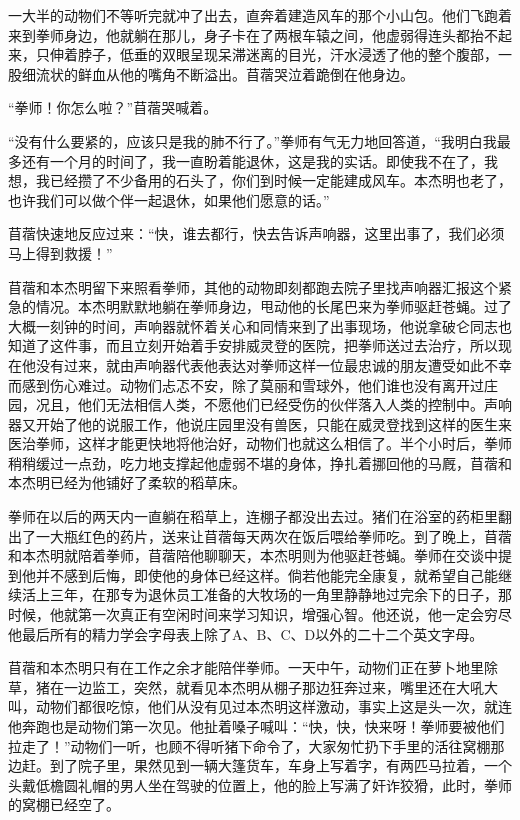 一大半的动物们不等听完就冲了出去，直奔着建造风车的那个小山包。他们飞跑着来到拳师身边，他就躺在那儿，身子卡在了两根车辕之间，他虚弱得连头都抬不起来，只伸着脖子，低垂的双眼呈现呆滞迷离的目光，汗水浸透了他的整个腹部，一股细流状的鲜血从他的嘴角不断溢出。苜蓿哭泣着跪倒在他身边。

“拳师！你怎么啦？”苜蓿哭喊着。

“没有什么要紧的，应该只是我的肺不行了。”拳师有气无力地回答道，“我明白我最多还有一个月的时间了，我一直盼着能退休，这是我的实话。即使我不在了，我想，我已经攒了不少备用的石头了，你们到时候一定能建成风车。本杰明也老了，也许我们可以做个伴一起退休，如果他们愿意的话。”

苜蓿快速地反应过来：“快，谁去都行，快去告诉声响器，这里出事了，我们必须马上得到救援！”

苜蓿和本杰明留下来照看拳师，其他的动物即刻都跑去院子里找声响器汇报这个紧急的情况。本杰明默默地躺在拳师身边，甩动他的长尾巴来为拳师驱赶苍蝇。过了大概一刻钟的时间，声响器就怀着关心和同情来到了出事现场，他说拿破仑同志也知道了这件事，而且立刻开始着手安排威灵登的医院，把拳师送过去治疗，所以现在他没有过来，就由声响器代表他表达对拳师这样一位最忠诚的朋友遭受如此不幸而感到伤心难过。动物们忐忑不安，除了莫丽和雪球外，他们谁也没有离开过庄园，况且，他们无法相信人类，不愿他们已经受伤的伙伴落入人类的控制中。声响器又开始了他的说服工作，他说庄园里没有兽医，只能在威灵登找到这样的医生来医治拳师，这样才能更快地将他治好，动物们也就这么相信了。半个小时后，拳师稍稍缓过一点劲，吃力地支撑起他虚弱不堪的身体，挣扎着挪回他的马厩，苜蓿和本杰明已经为他铺好了柔软的稻草床。

拳师在以后的两天内一直躺在稻草上，连棚子都没出去过。猪们在浴室的药柜里翻出了一大瓶红色的药片，送来让苜蓿每天两次在饭后喂给拳师吃。到了晚上，苜蓿和本杰明就陪着拳师，苜蓿陪他聊聊天，本杰明则为他驱赶苍蝇。拳师在交谈中提到他并不感到后悔，即使他的身体已经这样。倘若他能完全康复，就希望自己能继续活上三年，在那专为退休员工准备的大牧场的一角里静静地过完余下的日子，那时候，他就第一次真正有空闲时间来学习知识，增强心智。他还说，他一定会穷尽他最后所有的精力学会字母表上除了A、B、C、D以外的二十二个英文字母。

苜蓿和本杰明只有在工作之余才能陪伴拳师。一天中午，动物们正在萝卜地里除草，猪在一边监工，突然，就看见本杰明从棚子那边狂奔过来，嘴里还在大吼大叫，动物们都很吃惊，他们从没有见过本杰明这样激动，事实上这是头一次，就连他奔跑也是动物们第一次见。他扯着嗓子喊叫：“快，快，快来呀！拳师要被他们拉走了！”动物们一听，也顾不得听猪下命令了，大家匆忙扔下手里的活往窝棚那边赶。到了院子里，果然见到一辆大篷货车，车身上写着字，有两匹马拉着，一个头戴低檐圆礼帽的男人坐在驾驶的位置上，他的脸上写满了奸诈狡猾，此时，拳师的窝棚已经空了。

